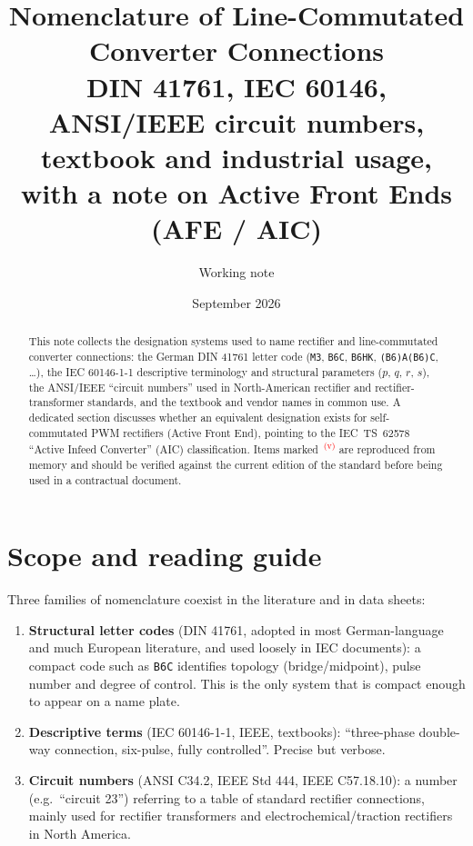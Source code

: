 \documentclass[11pt,a4paper]{article}
\title{Nomenclature of Line-Commutated Converter Connections\\
\large DIN 41761, IEC 60146, ANSI/IEEE circuit numbers, textbook and industrial usage,\\
with a note on Active Front Ends (AFE / AIC)}
\author{Working note}
\date{September 2026}
\newcommand{\code}[1]{\texttt{#1}}
\newcommand{\verify}{\textsuperscript{\textcolor{red}{(v)}}}
\begin{document}
\maketitle

\begin{abstract}
This note collects the designation systems used to name rectifier and line-commutated converter connections: the German DIN 41761 letter code (\code{M3}, \code{B6C}, \code{B6HK}, \code{(B6)A(B6)C}, \ldots), the IEC 60146-1-1 descriptive terminology and structural parameters ($p$, $q$, $r$, $s$), the ANSI/IEEE ``circuit numbers'' used in North-American rectifier and rectifier-transformer standards, and the textbook and vendor names in common use. A dedicated section discusses whether an equivalent designation exists for self-commutated PWM rectifiers (Active Front End), pointing to the IEC~TS~62578 ``Active Infeed Converter'' (AIC) classification. Items marked~\verify{} are reproduced from memory and should be verified against the current edition of the standard before being used in a contractual document.
\end{abstract}

\tableofcontents

\section{Scope and reading guide}

Three families of nomenclature coexist in the literature and in data sheets:

\begin{enumerate}
\item \textbf{Structural letter codes} (DIN 41761, adopted in most German-language and much European literature, and used loosely in IEC documents): a compact code such as \code{B6C} identifies topology (bridge/midpoint), pulse number and degree of control. This is the only system that is compact enough to appear on a name plate.
\item \textbf{Descriptive terms} (IEC 60146-1-1, IEEE, textbooks): ``three-phase double-way connection, six-pulse, fully controlled''. Precise but verbose.
\item \textbf{Circuit numbers} (ANSI C34.2, IEEE Std 444, IEEE C57.18.10): a number (e.g.\ ``circuit 23'') referring to a table of standard rectifier connections, mainly used for rectifier transformers and electrochemical/traction rectifiers in North America.
\end{enumerate}
\end{document}
